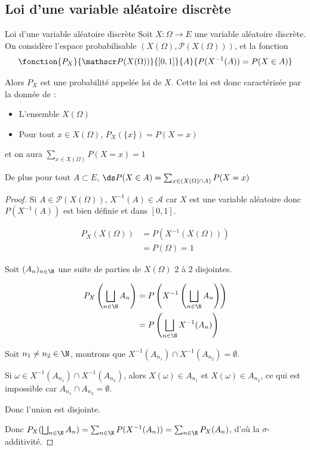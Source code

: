 \subsection{Loi d'une variable aléatoire discrète }

\begin{theoreme}{Loi d'une variable aléatoire discrète}{}
    Soit $X : \Omega \to E$ une variable aléatoire discrète. On considère l'espace probabilisable 
    $(X(\Omega), \mathscr P(X(\Omega)))$, et la fonction 
    $$\fonction{P_X}{\mathscr P(X(\Omega))}{[0, 1]}{A}{P(X^{-1}(A)) = P(X \in A)}$$

    Alors $P_X$ est une probabilité appelée loi de $X$. Cette loi est donc caractérisée par la donnée de : 
    \begin{itemize}
        \item L'ensemble $X(\Omega)$
        \item Pour tout $x \in X(\Omega)$, $P_X(\{x\}) = P(X = x)$
    \end{itemize}
    et on aura $\sum_{x \in X(\Omega)} P(X = x) = 1$

    De plus pour tout $A \subset E$, $\ds P(X \in A) = \sum_{x \in (X(\Omega) \cap A)} P(X = x)$
\end{theoreme}

\begin{proof}
    Si $A \in \mathscr P(X(\Omega))$, $X^{-1}(A) \in \mathcal A$ car $X$ est une variable aléatoire
    donc $P(X^{-1}(A))$ est bien définie et dans $[0, 1]$.

    \begin{align}
        P_X(X(\Omega)) & = P(X^{-1}(X(\Omega))) \\
        & = P(\Omega) = 1
    \end{align}


    \svspace Soit $(A_n)_{n \in \N}$ une suite de parties de $X(\Omega)$ 2 à 2 disjointes.

    \begin{align}
        P_X \left( \bigsqcup_{n \in \N} A_n \right) & = P\left( X^{-1}\left( \bigsqcup_{n \in \N} A_n \right) \right) \\
        & = P\left( \bigsqcup_{n \in \N} X^{-1}(A_n) \right) 
    \end{align}

    Soit $n_1 \neq n_2 \in \N$, montrons que $X^{-1}(A_{n_1}) \cap X^{-1}(A_{n_2}) = \emptyset$.

    Si $\omega \in X^{-1}(A_{n_1}) \cap X^{-1}(A_{n_2})$, alors $X(\omega) \in A_{n_1}$ et $X(\omega) \in A_{n_2}$,
    ce qui est impossible car $A_{n_1} \cap A_{n_2} = \emptyset$.

    Donc l'union est disjointe. 

    Donc $P_X(\bigsqcup_{n \in \N} A_n) = \sum_{n \in \N} P(X^{-1}(A_n)) = \sum_{n \in \N} P_X(A_n)$, 
    d'où la $\sigma$-additivité.

\end{proof}


